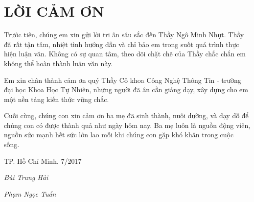\newpage
\chapter*{LỜI CẢM ƠN}
Trước tiên, chúng em xin gửi lời tri ân sâu sắc đến Thầy Ngô Minh Nhựt. Thầy đã rất tận tâm, nhiệt tình hướng dẫn và chỉ bảo em trong suốt quá trình thực hiện luận văn. Không có sự quan tâm, theo dõi chặt chẽ của Thầy chắc chắn em không thể hoàn thành luận văn này.

Em xin chân thành cảm ơn quý Thầy Cô khoa Công Nghệ Thông Tin - trường đại học Khoa Học Tự Nhiên, những người đã ân cần giảng dạy, xây dựng cho em một nền tảng kiến thức vững chắc. 

Cuối cùng, chúng con xin cảm ơn ba mẹ đã sinh thành, nuôi dưỡng, và dạy dỗ để chúng con có được thành quả như ngày hôm nay. Ba mẹ luôn là nguồn động viên, nguồn sức mạnh hết sức lớn lao mỗi khi chúng con gặp khó khăn trong cuộc sống.

\hfill TP. Hồ Chí Minh, 7/2017

\hfill \textit{Bùi Trung Hải}

\hfill \textit{Phạm Ngọc Tuấn}
